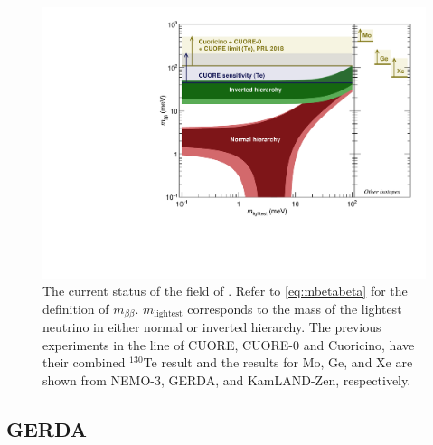 \begin{figure}[htbp]
\centering
\includegraphics[width=0.7\linewidth]{Figures/M_bb_vs_mlightest_CL_2018.pdf}
\caption[The current status of the field of \zeronubb]
{The current status of the field of \zeronubb.
Refer to  \autoref{eq:mbetabeta} for the definition of $m_{\beta\beta}$.
$m_{\textrm{lightest}}$ corresponds to the mass of the lightest neutrino in either normal or inverted hierarchy.
The previous experiments in the line of CUORE, CUORE-0 and Cuoricino, have their combined $^{130}$Te result and the results for Mo, Ge, and Xe are shown from NEMO-3, GERDA, and KamLAND-Zen, respectively.}
\label{fig:cuore-mbetabeta}
\end{figure}

\subsection{GERDA}

